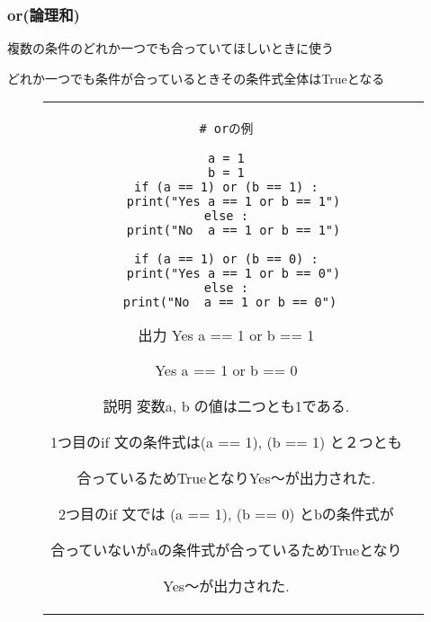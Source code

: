 \documentclass{jsarticle}
\begin{document}
\subsubsection{or(論理和)}
複数の条件のどれか一つでも合っていてほしいときに使う \par
どれか一つでも条件が合っているときその条件式全体はTrueとなる
\vspace{-5mm}
\begin{figure}[h]
	\begin{tabular}{cc}
		\begin{minipage}[t]{.4\textwidth}
			\begin{lstlisting}[caption=or]
# orの例

a = 1
b = 1
if (a == 1) or (b == 1) :
  print("Yes a == 1 or b == 1")
else :
  print("No  a == 1 or b == 1")

if (a == 1) or (b == 0) :
  print("Yes a == 1 or b == 0")
else :
  print("No  a == 1 or b == 0") \end{lstlisting}
		\end{minipage} \hspace{5mm}
		\begin{minipage}[t]{.6\textwidth}
			\begin{minipage}[t]{.5\textwidth}
				\begin{itembox}[l]{出力}
					Yes a == 1 or b == 1 \par
					Yes a == 1 or b == 0 \par
				\end{itembox}
			\end{minipage}
			\begin{itembox}[l]{説明}
				変数a, b の値は二つとも1である.  \par
				1つ目のif 文の条件式は(a == 1), (b == 1) と２つとも \par 合っているためTrueとなりYes～が出力された. \par
				2つ目のif 文では (a == 1), (b == 0) とbの条件式が \par 合っていないがaの条件式が合っているためTrueとなり \par Yes～が出力された.
			\end{itembox}
		\end{minipage}
	\end{tabular}
\end{figure}

\end{document}
